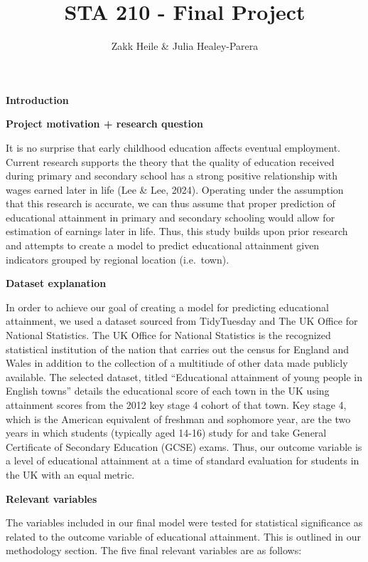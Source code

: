 \documentclass[
  letterpaper,
  DIV=11,
  numbers=noendperiod]{scrartcl}
\title{STA 210 - Final Project}
\author{Zakk Heile \& Julia Healey-Parera}
\date{}
\begin{document}
\maketitle
\ifdefined\Shaded\renewenvironment{Shaded}{\begin{tcolorbox}[interior hidden, borderline west={3pt}{0pt}{shadecolor}, frame hidden, breakable, enhanced, sharp corners, boxrule=0pt]}{\end{tcolorbox}}\fi

\textbf{Introduction}

\textbf{Project motivation + research question}

It is no surprise that early childhood education affects eventual
employment. Current research supports the theory that the quality of
education received during primary and secondary school has a strong
positive relationship with wages earned later in life (Lee \& Lee,
2024). Operating under the assumption that this research is accurate, we
can thus assume that proper prediction of educational attainment in
primary and secondary schooling would allow for estimation of earnings
later in life. Thus, this study builds upon prior research and attempts
to create a model to predict educational attainment given indicators
grouped by regional location (i.e.~town).~

\textbf{Dataset explanation}

In order to achieve our goal of creating a model for predicting
educational attainment, we used a dataset sourced from TidyTuesday and
The UK Office for National Statistics. The UK Office for National
Statistics is the recognized statistical institution of the nation that
carries out the census for England and Wales in addition to the
collection of a multitiude of other data made publicly available. The
selected dataset, titled ``Educational attainment of young people in
English towns'' details the educational score of each town in the UK
using attainment scores from the 2012 key stage 4 cohort of that town.
Key stage 4, which is the American equivalent of freshman and sophomore
year, are the two years in which students (typically aged 14-16) study
for and take General Certificate of Secondary Education (GCSE) exams.
Thus, our outcome variable is a level of educational attainment at a
time of standard evaluation for students in the UK with an equal
metric.~

\textbf{Relevant variables}

The variables included in our final model were tested for statistical
significance as related to the outcome variable of educational
attainment. This is outlined in our methodology section. The five final
relevant variables are as follows:~
\end{document}
